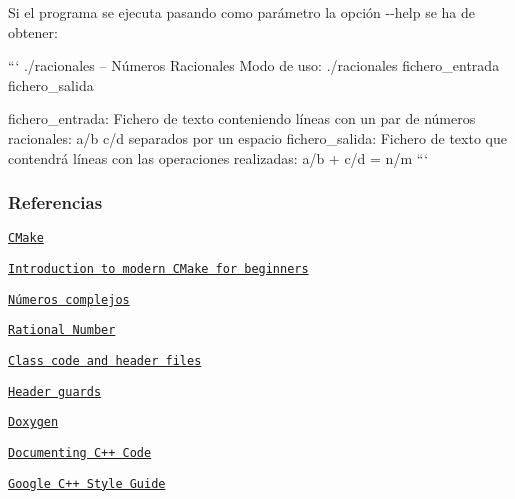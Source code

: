 Si el programa se ejecuta pasando como parámetro la opción {\ttfamily -\/-\/help} se ha de obtener\+:

``` ./racionales -- Números Racionales Modo de uso\+: ./racionales fichero\+\_\+entrada fichero\+\_\+salida

fichero\+\_\+entrada\+: Fichero de texto conteniendo líneas con un par de números racionales\+: {\ttfamily a/b c/d} separados por un espacio fichero\+\_\+salida\+: Fichero de texto que contendrá líneas con las operaciones realizadas\+: {\ttfamily a/b + c/d = n/m} ``` \subsubsection*{Referencias}


\begin{DoxyItemize}
\item \href{https://es.wikipedia.org/wiki/CMake}{\tt C\+Make}
\item \href{https://www.internalpointers.com/post/modern-cmake-beginner-introduction}{\tt Introduction to modern C\+Make for beginners}
\item \href{https://es.wikipedia.org/wiki/N%C3%BAmero_complejo}{\tt Números complejos}
\item \href{https://en.wikipedia.org/wiki/Rational_number}{\tt Rational Number}
\item \href{https://www.learncpp.com/cpp-tutorial/89-class-code-and-header-files/}{\tt Class code and header files}
\item \href{https://www.learncpp.com/cpp-tutorial/header-guards/}{\tt Header guards}
\item \href{https://en.wikipedia.org/wiki/Doxygen}{\tt Doxygen}
\item \href{https://developer.lsst.io/cpp/api-docs.html}{\tt Documenting C++ Code}
\item \href{https://google.github.io/styleguide/cppguide.html}{\tt Google C++ Style Guide} 
\end{DoxyItemize}
